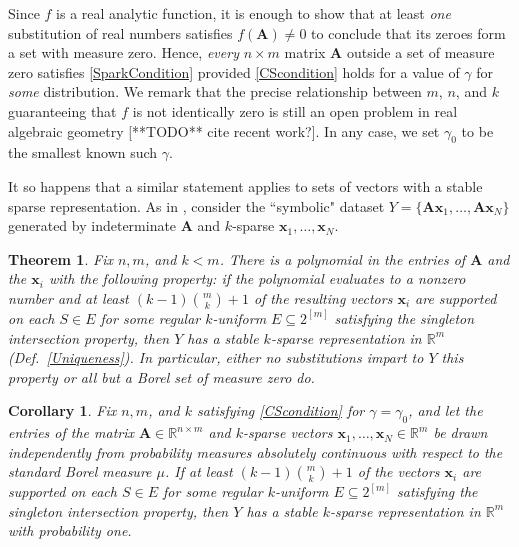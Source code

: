 \documentclass[9pt,twocolumn]{pnas-new}
\newtheorem{theorem}{Theorem}
\newtheorem{corollary}{Corollary}
\begin{document}
Since $f$ is a real analytic function, it is enough to show that at least \emph{one} substitution of real numbers satisfies $f(\mathbf{A}) \neq 0$ to conclude that its zeroes form a set with measure zero. Hence, \emph{every} $n \times m$ matrix $\mathbf{A}$ outside a set of measure zero satisfies \eqref{SparkCondition} provided \eqref{CScondition} holds for a value of $\gamma$ for \emph{some} distribution. We remark that the precise relationship between $m$, $n$, and $k$ guaranteeing that $f$ is not identically zero is still an open problem in real algebraic geometry [**TODO** cite recent work?]. In any case, we set $\gamma_0$ to be the smallest known such $\gamma$.

It so happens that a similar statement applies to sets of vectors with a stable sparse representation. As in \cite[Sec.~IV]{Hillar15}, consider the ``symbolic" dataset $Y = \{\mathbf{A}\mathbf{x}_1,\ldots,\mathbf{A} \mathbf{x}_N\}$ generated by indeterminate $\mathbf{A}$ and $k$-sparse $\mathbf{x}_1, \ldots, \mathbf{x}_N$. 

\begin{theorem}\label{robustPolythm} %
Fix $n, m$, and $k < m$. There is a polynomial in the entries of $\mathbf{A}$ and the $\mathbf{x}_i$ with the following property:  if the polynomial evaluates to a nonzero number and at least \mbox{$(k-1){m \choose k}+1$} of the resulting vectors $\mathbf{x}_i$ are supported on each $S \in E$ for some regular $k$-uniform $E \subseteq 2^{[m]}$ satisfying the singleton intersection property, then $Y$ has a stable $k$-sparse representation in $\mathbb{R}^m$ (Def.~\ref{Uniqueness}). In particular, either no substitutions impart to $Y$ this property or all but a Borel set of measure zero do. 
\end{theorem}


\begin{corollary}\label{ProbabilisticCor}
Fix $n, m$, and $k$ satisfying \eqref{CScondition} for $\gamma = \gamma_0$, and let the entries of the matrix $\mathbf{A} \in \mathbb{R}^{n \times m}$ and $k$-sparse vectors $\mathbf{x}_1, \ldots, \mathbf{x}_N \in \mathbb{R}^m$ be drawn independently from probability measures absolutely continuous with respect to the standard Borel measure $\mu$. If at least $(k-1){m \choose k} + 1$ of the vectors $\mathbf{x}_i$ are supported on each $S \in E$ for some regular $k$-uniform $E \subseteq 2^{[m]}$ satisfying the singleton intersection property, then $Y$ has a stable $k$-sparse representation in $\mathbb{R}^m$ with probability one.
\end{corollary}
\end{document}
